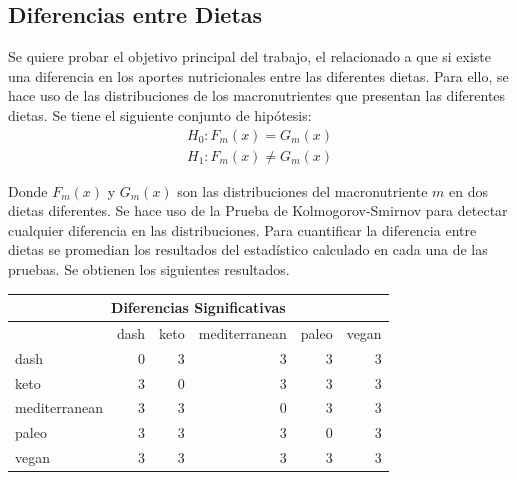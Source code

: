 \documentclass[12pt,a4paper]{article}
\begin{document}
{        \subsection{Diferencias entre Dietas}
        {
            Se quiere probar el objetivo principal del trabajo, el relacionado a que si
            existe una diferencia en los aportes nutricionales entre las diferentes 
            dietas. Para ello, se hace uso de las distribuciones de los macronutrientes 
            que presentan las diferentes dietas. Se tiene el siguiente conjunto de  
            hipótesis:
            \begin{align*}
                H_0 : F_m(x) = G_m(x) \\
                H_1 : F_m(x) \ne G_m(x)
            \end{align*}

            Donde $F_m(x)$ y $G_m(x)$ son las distribuciones del macronutriente $m$ en 
            dos dietas diferentes. Se hace uso de la Prueba de Kolmogorov-Smirnov para detectar 
            cualquier diferencia en las distribuciones. Para cuantificar la diferencia entre dietas 
            se promedian los resultados del estadístico calculado en cada una de las pruebas.
            Se obtienen los siguientes resultados.

            \begin{center}
                \begin{tabular}{lrrrrr}
                \toprule
                    \multicolumn{6}{c}{Diferencias Significativas} \\
                \midrule
                    & dash & keto & mediterranean & paleo & vegan \\
                \midrule
                    dash & 0 & 3 & 3 & 3 & 3 \\
                    keto & 3 & 0 & 3 & 3 & 3 \\
                    mediterranean & 3 & 3 & 0 & 3 & 3 \\
                    paleo & 3 & 3 & 3 & 0 & 3 \\
                    vegan & 3 & 3 & 3 & 3 & 3 \\
                \bottomrule
                \end{tabular}
            \end{center}
            
}}
\end{document}

